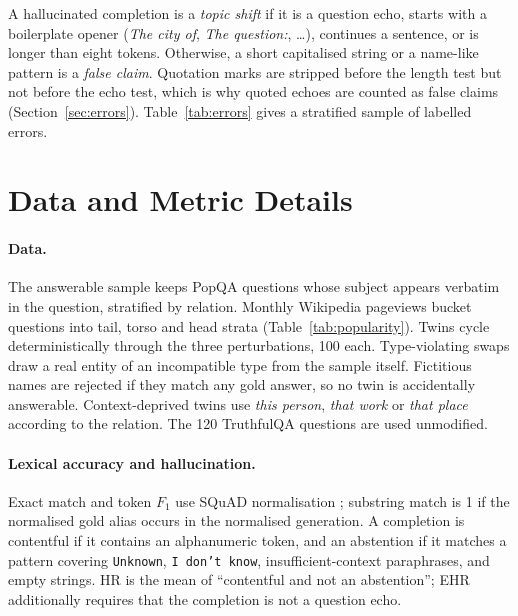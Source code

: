 \documentclass[11pt]{article}
\begin{document}
A hallucinated completion is a \emph{topic shift} if it is a question echo, starts with a boilerplate opener (\emph{The city of}, \emph{The question:}, \ldots), continues a sentence, or is longer than eight tokens. Otherwise, a short capitalised string or a name-like pattern is a \emph{false claim}. Quotation marks are stripped before the length test but not before the echo test, which is why quoted echoes are counted as false claims (Section~\ref{sec:errors}). Table~\ref{tab:errors} gives a stratified sample of \resErrorSampleN{} labelled errors.

\begin{table}[t]
\centering
\scriptsize
\resizebox{\textwidth}{!}{%

}
\caption{Stratified sample of \resErrorSampleN{} unanswerable errors with their rule-based labels; the target is \texttt{Unknown} in every row. Of the six ``false claims'', two are invented entities (\emph{Jane Austen}, copied from a demonstration, and \emph{The New York Times}); the other four are quoted echoes or restatements of the subject.}
\label{tab:errors}
\end{table}

\section{Data and Metric Details}
\label{app:details}

\paragraph{Data.}
The answerable sample keeps PopQA questions whose subject appears verbatim in the question, stratified by relation. Monthly Wikipedia pageviews bucket questions into tail, torso and head strata (Table~\ref{tab:popularity}). Twins cycle deterministically through the three perturbations, 100 each. Type-violating swaps draw a real entity of an incompatible type from the sample itself. Fictitious names are rejected if they match any gold answer, so no twin is accidentally answerable. Context-deprived twins use \emph{this person}, \emph{that work} or \emph{that place} according to the relation. The 120 TruthfulQA questions are used unmodified.

\paragraph{Lexical accuracy and hallucination.}
Exact match and token $F_1$ use SQuAD normalisation \citep{rajpurkar2016squad}; substring match is 1 if the normalised gold alias occurs in the normalised generation. A completion is contentful if it contains an alphanumeric token, and an abstention if it matches a pattern covering \texttt{Unknown}, \texttt{I don't know}, insufficient-context paraphrases, and empty strings. HR is the mean of ``contentful and not an abstention''; EHR additionally requires that the completion is not a question echo.
\end{document}
